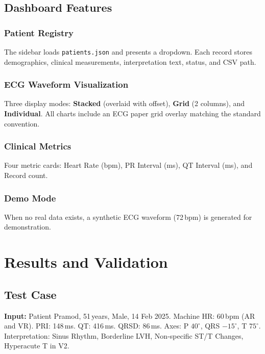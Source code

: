\documentclass[conference]{IEEEtran}
\begin{document}
\subsection{Dashboard Features}

\subsubsection{Patient Registry}
The sidebar loads \texttt{patients.json} and presents a dropdown. Each record
stores demographics, clinical measurements, interpretation text, status, and
CSV path.

\subsubsection{ECG Waveform Visualization}
Three display modes: \textbf{Stacked} (overlaid with offset),
\textbf{Grid} (2 columns), and \textbf{Individual}. All charts include an
ECG paper grid overlay matching the standard convention.

\subsubsection{Clinical Metrics}
Four metric cards: Heart Rate (bpm), PR Interval (ms), QT Interval (ms),
and Record count.

\subsubsection{Demo Mode}
When no real data exists, a synthetic ECG waveform (72\,bpm) is generated
for demonstration.

\section{Results and Validation}

\subsection{Test Case}

\textbf{Input:} Patient Pramod, 51\,years, Male, 14 Feb 2025. Machine HR:
60\,bpm (AR and VR). PRI: 148\,ms. QT: 416\,ms. QRSD: 86\,ms. Axes: P
$40^\circ$, QRS $-15^\circ$, T $75^\circ$. Interpretation: Sinus Rhythm,
Borderline LVH, Non-specific ST/T Changes, Hyperacute T in V2.
\end{document}
